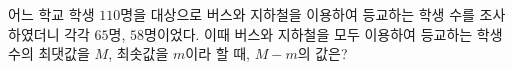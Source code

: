 어느 학교 학생 $110$명을 대상으로 버스와 지하철을 이용하여 등교하는 학생 수를 조사하였더니 각각 $65$명, $58$명이었다. 이때 버스와 지하철을 모두 이용하여 등교하는 학생 수의 최댓값을 $M$, 최솟값을 $m$이라 할 때, $M-m$의 값은?

